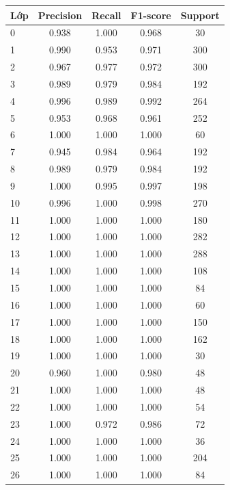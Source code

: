 \documentclass[12pt,a4paper]{article}
\begin{document}
\begin{table}[H]
\centering
\footnotesize
\begin{tabular}{@{}lcccc@{}}
\toprule
\textbf{Lớp} & \textbf{Precision} & \textbf{Recall} & \textbf{F1-score} & \textbf{Support} \\ \midrule
\rowcolor{rowgray} 0  & 0.938 & 1.000 & 0.968 & 30 \\
1  & 0.990 & 0.953 & 0.971 & 300 \\
\rowcolor{rowgray} 2  & 0.967 & 0.977 & 0.972 & 300 \\
3  & 0.989 & 0.979 & 0.984 & 192 \\
\rowcolor{rowgray} 4  & 0.996 & 0.989 & 0.992 & 264 \\
5  & 0.953 & 0.968 & 0.961 & 252 \\
\rowcolor{rowgray} 6  & 1.000 & 1.000 & 1.000 & 60 \\
7  & 0.945 & 0.984 & 0.964 & 192 \\
\rowcolor{rowgray} 8  & 0.989 & 0.979 & 0.984 & 192 \\
9  & 1.000 & 0.995 & 0.997 & 198 \\
\rowcolor{rowgray} 10 & 0.996 & 1.000 & 0.998 & 270 \\
11 & 1.000 & 1.000 & 1.000 & 180 \\
\rowcolor{rowgray} 12 & 1.000 & 1.000 & 1.000 & 282 \\
13 & 1.000 & 1.000 & 1.000 & 288 \\
\rowcolor{rowgray} 14 & 1.000 & 1.000 & 1.000 & 108 \\
15 & 1.000 & 1.000 & 1.000 & 84 \\
\rowcolor{rowgray} 16 & 1.000 & 1.000 & 1.000 & 60 \\
17 & 1.000 & 1.000 & 1.000 & 150 \\
\rowcolor{rowgray} 18 & 1.000 & 1.000 & 1.000 & 162 \\
19 & 1.000 & 1.000 & 1.000 & 30 \\
\rowcolor{rowgray} 20 & 0.960 & 1.000 & 0.980 & 48 \\
21 & 1.000 & 1.000 & 1.000 & 48 \\
\rowcolor{rowgray} 22 & 1.000 & 1.000 & 1.000 & 54 \\
23 & 1.000 & 0.972 & 0.986 & 72 \\
\rowcolor{rowgray} 24 & 1.000 & 1.000 & 1.000 & 36 \\
25 & 1.000 & 1.000 & 1.000 & 204 \\
\rowcolor{rowgray} 26 & 1.000 & 1.000 & 1.000 & 84 \\

\end{tabular}
\end{table}
\end{document}
